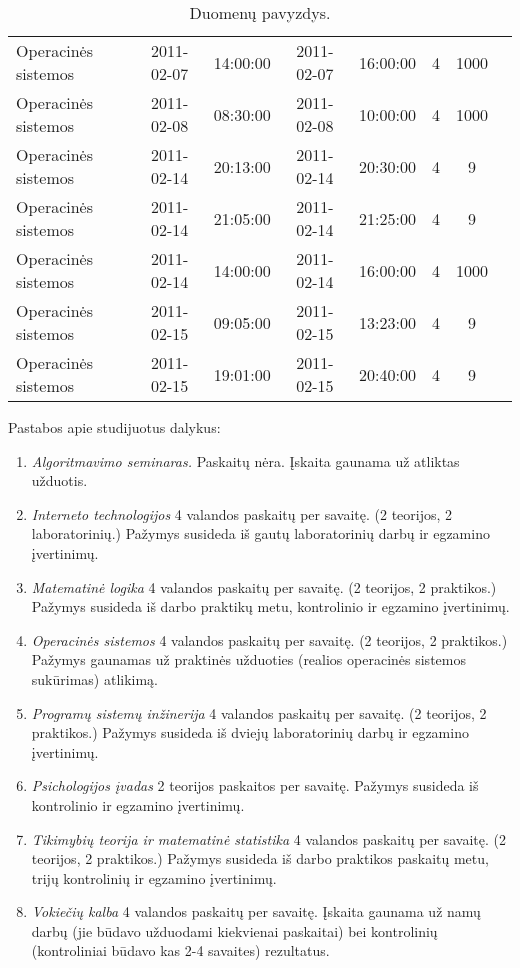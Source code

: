 \begin{sidewaystable}[ht!]
\begin{tabular}{|l|c|c|c|c|c|c|c|}
Operacinės sistemos&2011-02-07&14:00:00&2011-02-07&16:00:00&4&1000\\
Operacinės sistemos&2011-02-08&08:30:00&2011-02-08&10:00:00&4&1000\\
Operacinės sistemos&2011-02-14&20:13:00&2011-02-14&20:30:00&4&9\\
Operacinės sistemos&2011-02-14&21:05:00&2011-02-14&21:25:00&4&9\\
Operacinės sistemos&2011-02-14&14:00:00&2011-02-14&16:00:00&4&1000\\
Operacinės sistemos&2011-02-15&09:05:00&2011-02-15&13:23:00&4&9\\
Operacinės sistemos&2011-02-15&19:01:00&2011-02-15&20:40:00&4&9\\
\hline
  \end{tabular}
  \caption{Duomenų pavyzdys.}
  \label{tab:data_sample}
\end{sidewaystable}

Pastabos apie studijuotus dalykus:
\begin{enumerate}
  \item
    \label{note:algoritmavimo_seminaras}
    \emph{Algoritmavimo seminaras.} 
    Paskaitų nėra. Įskaita gaunama už atliktas užduotis.
  \item
    \label{note:interneto_technologijos}
    \emph{Interneto technologijos}
    4 valandos paskaitų per savaitę. (2 teorijos, 2 laboratorinių.)
    Pažymys susideda iš gautų laboratorinių darbų ir egzamino 
    įvertinimų.
  \item
    \label{note:matematine_logika}
    \emph{Matematinė logika}
    4 valandos paskaitų per savaitę. (2 teorijos, 2 praktikos.)
    Pažymys susideda iš darbo praktikų metu, kontrolinio ir egzamino
    įvertinimų.
  \item
    \label{note:operacines_sistemos}
    \emph{Operacinės sistemos}
    4 valandos paskaitų per savaitę. (2 teorijos, 2 praktikos.)
    Pažymys gaunamas už praktinės užduoties (realios operacinės
    sistemos sukūrimas) atlikimą.
  \item
    \label{note:programu_sistemu_inzinerija}
    \emph{Programų sistemų inžinerija}
    4 valandos paskaitų per savaitę. (2 teorijos, 2 praktikos.)
    Pažymys susideda iš dviejų laboratorinių darbų ir egzamino įvertinimų.
  \item
    \label{note:psichologijos_ivadas}
    \emph{Psichologijos įvadas}
    2 teorijos paskaitos per savaitę.
    Pažymys susideda iš kontrolinio ir egzamino įvertinimų.
  \item
    \label{note:tikimybiu_teorija}
    \emph{Tikimybių teorija ir matematinė statistika}
    4 valandos paskaitų per savaitę. (2 teorijos, 2 praktikos.)
    Pažymys susideda iš darbo praktikos paskaitų metu, trijų kontrolinių
    ir egzamino įvertinimų.
  \item 
    \label{note:vokieciu_kalba}
    \emph{Vokiečių kalba}
    4 valandos paskaitų per savaitę.
    Įskaita gaunama už namų darbų (jie būdavo užduodami kiekvienai
    paskaitai) bei kontrolinių (kontroliniai būdavo kas 2-4 savaites)
    rezultatus.
\end{enumerate}
